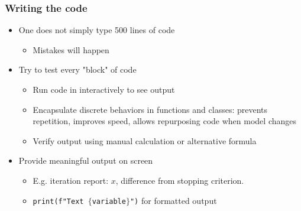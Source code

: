 \documentclass[bigger]{beamer}
\begin{document}
\begin{frame}
\frametitle{Writing the code}

\begin{itemize}
\item One does not simply type 500 lines of code

\begin{itemize}
\item Mistakes will happen
\end{itemize}

\item Try to test every "block" of code

\begin{itemize}
\item Run code in interactively to see output

\item Encapsulate discrete behaviors in functions and classes: prevents repetition, improves speed, allows repurposing code when model changes

\item Verify output using manual calculation or alternative formula
\end{itemize}

\item Provide meaningful output on screen

\begin{itemize}
\item E.g. iteration report: $x$, difference from stopping criterion.
\item \texttt{print(f"Text $\{$variable$\}$")} for formatted output

\end{itemize}
\end{itemize}

\end{frame}
\end{document}

